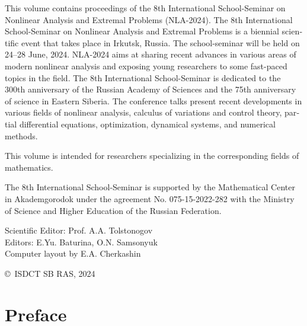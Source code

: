 \documentclass[12pt,final]{llncs}
\begin{document}
 \begin{english}
   This volume contains proceedings of the 8th International School-Seminar on Nonlinear Analysis and Extremal Problems (NLA-2024).
   The 8th International School-Seminar on Nonlinear Analysis and Extremal Problems is a biennial scientific event that takes place in Irkutsk, Russia. The school-seminar  will be held on 24--28 June, 2024. NLA-2024 aims at sharing recent advances in various areas of modern nonlinear analysis and exposing young researchers to some fast-paced topics in the field. The 8th International School-Seminar is dedicated to the 300th anniversary of the Russian Academy of Sciences and the 75th anniversary of science in Eastern Siberia.
   The conference talks present recent developments in
   various fields of nonlinear analysis, calculus of variations and control theory,  partial differential equations, optimization, dynamical systems,
   and  numerical methods.

   This volume is intended for researchers specializing in the corresponding fields of  ma\-the\-ma\-tics.

   The 8th International School-Seminar is supported by the Mathematical Center in Akademgorodok under the agreement No. 075-15-2022-282 with the Ministry of Science and Higher Education of the Russian Federation.
 \end{english}
  \vspace{1cm}



 \vfill

  \vfill

 Scientific Editor: Prof. A.\;A. Tolstonogov\\[0.3em]

 Editors: E.\;Yu. Baturina, O.\;N. Samsonyuk\\[0.3em]

 Computer layout by E.\;A. Cherkashin

 \vfill



 \begin{flushright}
 \copyright\ ISDCT SB RAS, 2024
\end{flushright}


\chapter*{Preface}
%
\end{document}

